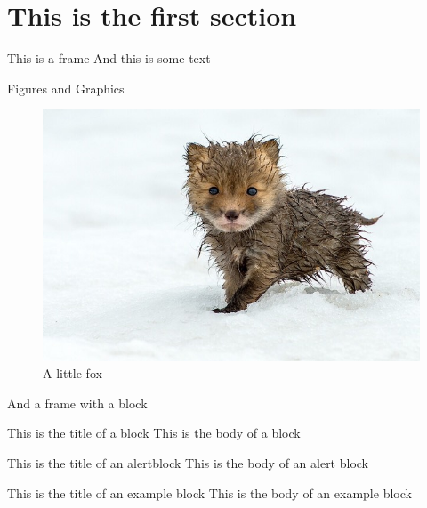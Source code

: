 \documentclass[xcolor=svgnames, 10pt]{beamer}
\begin{document}
{ 

}


\section{This is the first section} 


\begin{frame}{This is a frame}
    And this is some text
\end{frame}


\begin{frame}{Figures and Graphics}
    \begin{figure}
        \centering
        \includegraphics[scale=0.3]{fox}
        \caption{A little fox}
    \end{figure}
\end{frame}


\begin{frame}{And a frame with a block}
    \begin{block}{This is the title of a block}
    This is the body of a block 
    \end{block}

    \begin{alertblock}{This is the title of an alertblock}
    This is the body of an alert block 
    \end{alertblock}

    \begin{exampleblock}{This is the title of an example block}
    This is the body of an example block 
    \end{exampleblock}

\end{frame}
\end{document}
